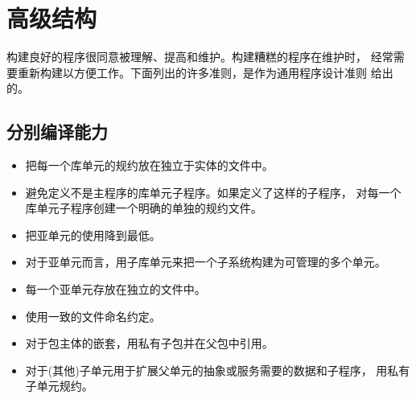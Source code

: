 %
%
%

\section{高级结构}
\begin{blockindent}
构建良好的程序很同意被理解、提高和维护。构建糟糕的程序在维护时，
经常需要重新构建以方便工作。下面列出的许多准则，是作为通用程序设计准则
给出的。
\end{blockindent}

\subsection{分别编译能力}
\begin{itemize}
\item 把每一个库单元的规约放在独立于实体的文件中。
\item 避免定义不是主程序的库单元子程序。如果定义了这样的子程序，
对每一个库单元子程序创建一个明确的单独的规约文件。
\item 把亚单元的使用降到最低。
\item 对于亚单元而言，用子库单元来把一个子系统构建为可管理的多个单元。
\item 每一个亚单元存放在独立的文件中。
\item 使用一致的文件命名约定。
\item 对于包主体的嵌套，用私有子包并在父包中引用。
\item 对于(其他)子单元用于扩展父单元的抽象或服务需要的数据和子程序，
 用私有子单元规约。
\end{itemize}

